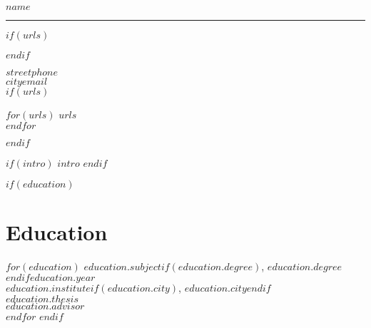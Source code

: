 \documentclass[$fontsize$, a4paper]{article}
\begin{document}
{\LARGE $name$}\\
\noindent\rule{13.85cm}{0.4pt}

$if(urls)$
\begin{multicols}{2}
$endif$

$street$\hfill{$phone$}\\
$city$\hfill{$email$}\\



$if(urls)$
\columnbreak

$for(urls)$
\href{http://$urls$}{$urls$}\\
$endfor$
\end{multicols}
$endif$

\vspace{10pt}

$if(intro)$
$intro$
$endif$

$if(education)$
\section*{Education}
\noindent
$for(education)$
\textbf{$education.subject$}$if(education.degree)$, $education.degree$$endif$\hfill{\textsc{$education.year$}}\\
$education.institute$$if(education.city)$, $education.city$$endif$\\
\emph{$education.thesis$}\\
$education.advisor$\\[.2cm]
$endfor$
$endif$
\end{document}
